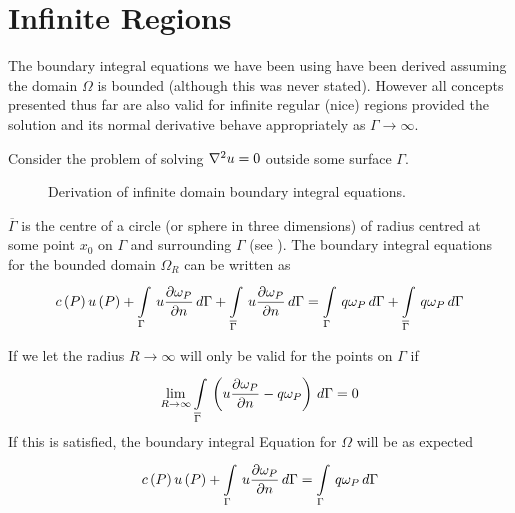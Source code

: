 \section{Infinite Regions}

The boundary integral equations we have been using have been derived assuming
the domain $\Omega$ is bounded (although this was never stated). However all
concepts presented thus far are also valid for infinite regular (\ie nice)
regions provided the solution and its normal derivative behave appropriately
as $\Gamma \rightarrow \infty$.

Consider the problem of solving $\nabla^{2} {u}=0$ outside some surface
$\Gamma$.

\begin{figure} \centering
  
  \caption{Derivation of infinite domain boundary integral equations.}
  \label{fig:symm}
\end{figure}

$\overline{\Gamma}$ is the centre of a circle (or sphere in three dimensions) 
of radius centred at some point $x_{0}$ on $\Gamma$ and surrounding $\Gamma$
(see ).  The boundary integral equations for the bounded
domain $\Omega_{R}$ can be written as
\begin{equation}
   c\left( P \right)   u\left( P \right)  +    \displaystyle\int\limits_{\Gamma}^{} \,u  \dfrac{\partial \omega_{P}}{\partial n} \,d\Gamma   +
    \displaystyle\int\limits_{\overline{\Gamma}}^{} \,u  \dfrac{\partial \omega_{P}}{\partial n} \,d\Gamma  =
     \displaystyle\int\limits_{\Gamma}^{} \,q \omega_{P}\,d\Gamma   +   \displaystyle\int\limits_{\overline{\Gamma}}^{} \,q \omega_{P}\,d\Gamma 
  \label{eqn:boundinteg}
\end{equation}

If we let the radius $R \rightarrow \infty$ 
will only be valid for the points on $\Gamma$ if
\begin{equation}
  \lim_{R \rightarrow\infty}  \displaystyle\int\limits_{\overline{\Gamma}}^{} \,\left( u 
     \dfrac{\partial \omega_{P}}{\partial n}  - q \omega_{P} \right)\,d\Gamma  = 0
  \label{eqn:limit}
\end{equation}
If this is satisfied, the boundary integral Equation for $\Omega$ will be as
expected \ie
\begin{equation}
   c\left( P \right)   u\left( P \right)  +    \displaystyle\int\limits_{\Gamma}^{} \,u  \dfrac{\partial \omega_{P}}{\partial n} \,d\Gamma  
  =    \displaystyle\int\limits_{\Gamma}^{} \,q \omega_{P}\,d\Gamma  
  \label{eqn:omega}
\end{equation}

